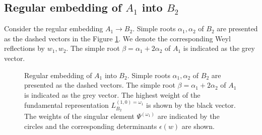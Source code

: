 \documentclass[12pt]{iopart}
\theoremstyle{definition}
\begin{document}
\subsection{Regular embedding of $A_1$ into $B_2$}
\label{sec:regul-embedd-a_1}

Consider the regular embedding $A_1\to B_2$. Simple roots $\alpha_1, \alpha_2$ of $B_2$ are presented as the dashed vectors in the Figure \ref{fig:B2_A1}. We denote the corresponding Weyl reflections by $w_1, w_2$. The simple root $\beta = \alpha_1+2\alpha_2$ of $A_1$ is indicated as the grey vector.


\begin{figure}[p]
  \noindent{}
  \caption{Regular embedding of $A_1$ into $B_2$. Simple roots $\alpha_1, \alpha_2$ of $B_2$ are presented as the dashed vectors.
    The simple root $\beta = \alpha_1+2\alpha_2$ of $A_1$ is indicated as the grey vector.
    The highest weight of the fundamental representation $L^{(1,0)=\omega_1}_{B_2}$ is shown by the black vector.
    The weights of the singular element $\Psi^{(\omega_1)}$ are indicated by the circles and the corresponding determinants $\epsilon(w)$ are shown.}
  \label{fig:B2_A1}


\end{figure}
\end{document}
